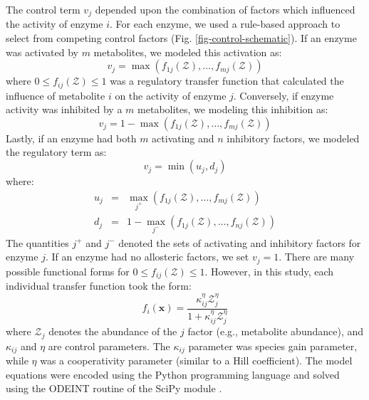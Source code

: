 \documentclass[12pt]{article}
\begin{document}
The control term $v_{j}$ depended upon the combination of factors which influenced the activity of enzyme $i$.
For each enzyme, we used a rule-based approach to select from competing control factors (Fig. \ref{fig-control-schematic}). 
If an enzyme was activated by $m$ metabolites, we modeled this activation as:
\begin{equation}
	v_{j} = \max\left(f_{1j}\left(\mathcal{Z}\right),\hdots,f_{mj}\left(\mathcal{Z}\right)\right)
\end{equation}where $0\leq f_{ij}\left(\mathcal{Z}\right)\leq 1$ was a regulatory transfer function that calculated the influence of metabolite $i$ on the activity of enzyme $j$. 
Conversely, if enzyme activity was inhibited by a $m$ metabolites, we modeling this inhibition as:
\begin{equation}
	v_{j} = 1 - \max\left(f_{1j}\left(\mathcal{Z}\right),\hdots,f_{mj}\left(\mathcal{Z}\right)\right)
\end{equation}Lastly, if an enzyme had both $m$ activating and $n$ inhibitory factors, we modeled the regulatory term as:
\begin{equation}
	v_{j} = \min\left(u_{j},d_{j}\right)
\end{equation}where:
\begin{eqnarray}
	u_{j} &=& \max_{j^{+}}\left(f_{1j}\left(\mathcal{Z}\right),\hdots,f_{mj}\left(\mathcal{Z}\right)\right) \\
	d_{j} &=& 1 - \max_{j^{-}}\left(f_{1j}\left(\mathcal{Z}\right),\hdots,f_{nj}\left(\mathcal{Z}\right)\right)
\end{eqnarray}
The quantities $j^{+}$ and $j^{-}$ denoted the sets of activating and inhibitory factors for enzyme $j$. 
If an enzyme had no allosteric factors, we set $v_{j} = 1$.
There are many possible functional forms for $0\leq f_{ij}\left(\mathcal{Z}\right)\leq 1$. 
However, in this study, each individual transfer function took the form:
\begin{equation}\label{eqn:control-factor}
	f_{i}\left(\mathbf{x}\right) = \frac{\kappa_{ij}^{\eta}\mathcal{Z}_{j}^{\eta}}{1 + \kappa_{ij}^{\eta}\mathcal{Z}_{j}^{\eta}}
\end{equation}where $\mathcal{Z}_{j}$ denotes the abundance of the $j$ factor (e.g., metabolite abundance), and $\kappa_{ij}$ and $\eta$ are control parameters. 
The $\kappa_{ij}$ parameter was species gain parameter, while $\eta$ was a cooperativity parameter (similar to a Hill coefficient).
The model equations were encoded using the Python programming language and solved using the ODEINT routine of the SciPy module \citep{SCIPY}.
\end{document}
